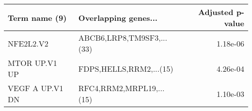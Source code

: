 \begin{tabular}{llr}
\toprule
  Term name (9) &      Overlapping genes... &  Adjusted p-value \\
\midrule
      NFE2L2.V2 & ABCB6,LRP8,TM9SF3,...(33) &          1.18e-06 \\
  MTOR UP.V1 UP &   FDPS,HELLS,RRM2,...(15) &          4.26e-04 \\
VEGF A UP.V1 DN &  RFC4,RRM2,MRPL19,...(15) &          1.10e-03 \\
\bottomrule
\end{tabular}

